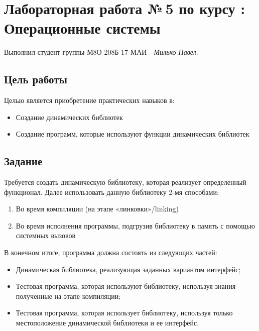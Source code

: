 \documentclass[12pt]{article}
\begin{document}
\section*{\centering Лабораторная работа №\,5 по курсу :\\ Операционные системы}

\noindent Выполнил студент группы М8О-208Б-17 МАИ \,\, \textit{Милько Павел}.

\subsection*{Цель работы}

\noindent Целью является приобретение практических навыков в:

\begin{itemize}
    \item Создание динамических библиотек
    \item Создание программ, которые используют функции динамических библиотек
\end{itemize}

\subsection*{Задание}

\noindent Требуется создать динамическую библиотеку, которая реализует определенный функционал. Далее использовать данную библиотеку 2-мя способами:

\begin{enumerate}
    \item Во время компиляции (на этапе «линковки»/linking)
    \item Во время исполнения программы, подгрузив библиотеку в память с помощью системных вызовов
\end{enumerate}

\noindent В конечном итоге, программа должна состоять из следующих частей:

\begin{itemize}
    \item Динамическая библиотека, реализующая заданных вариантом интерфейс;
    \item Тестовая программа, которая используют библиотеку, используя знания полученные на этапе компиляции;
    \item Тестовая программа, которая использует библиотеку, используя только местоположение динамической библиотеки и ее интерфейс.
\end{itemize}
\end{document}
